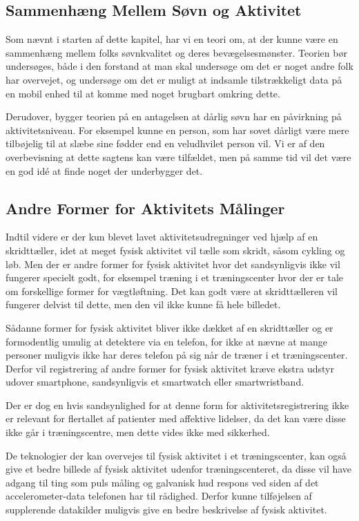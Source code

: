 \subsection{Sammenhæng Mellem Søvn og Aktivitet}
Som nævnt i starten af dette kapitel, har vi en teori om, at der kunne være en sammenhæng mellem folks søvnkvalitet og deres bevægelsesmønster.
Teorien bør undersøges, både i den forstand at man skal undersøge om det er noget andre folk har overvejet, og undersøge om det er muligt at indsamle tilstrækkeligt data på en mobil enhed til at komme med noget brugbart omkring dette.

Derudover, bygger teorien på en antagelsen at dårlig søvn har en påvirkning på aktivitetsniveau.
For eksempel kunne en person, som har sovet dårligt være mere tilbøjelig til at slæbe sine fødder end en veludhvilet person vil.
Vi er af den overbevisning at dette sagtens kan være tilfældet, men på samme tid vil det være en god idé at finde noget der underbygger det.

\subsection{Andre Former for Aktivitets Målinger}
Indtil videre er der kun blevet lavet aktivitetsudregninger ved hjælp af en skridttæller, idet at meget fysisk aktivitet vil tælle som skridt, såsom cykling og løb. 
Men der er andre former for fysisk aktivitet hvor det sandsynligvis ikke vil fungerer specielt godt, for eksempel træning i et træningscenter hvor der er tale om forskellige former for vægtløftning. 
Det kan godt være at skridttælleren vil fungerer delvist til dette, men den vil ikke kunne få hele billedet.

Sådanne former for fysisk aktivitet bliver ikke dækket af en skridttæller og er formodentlig umulig at detektere via en telefon, for ikke at nævne at mange personer muligvis ikke har deres telefon på sig når de træner i et træningscenter.
Derfor vil registrering af andre former for fysisk aktivitet kræve ekstra udstyr udover smartphone, sandsynligvis et smartwatch eller smartwristband.

Der er dog en hvis sandsynlighed for at denne form for aktivitetsregistrering ikke er relevant for flertallet af patienter med affektive lidelser, da det kan være disse ikke går i træningscentre, men dette vides ikke med sikkerhed.

De teknologier der kan overvejes til fysisk aktivitet i et træningscenter, kan også give et bedre billede af fysisk aktivitet udenfor træningscenteret, da disse vil have adgang til ting som puls måling og galvanisk hud respons ved siden af det accelerometer-data telefonen har til rådighed.
Derfor kunne tilføjelsen af supplerende datakilder muligvis give en bedre beskrivelse af fysisk aktivitet.